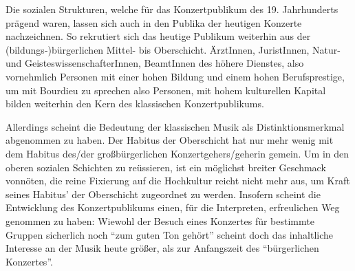 \documentclass[a4paper, german, oneside]{scrbook}
\begin{document}
Die sozialen Strukturen, welche für das Konzertpublikum des 19. Jahrhunderts prägend waren, lassen sich auch in den Publika der heutigen Konzerte nachzeichnen. So rekrutiert sich das heutige Publikum weiterhin aus der (bildungs-)bürgerlichen Mittel- bis Oberschicht. ÄrztInnen, JuristInnen, Natur-und GeisteswissenschafterInnen, BeamtInnen des höhere Dienstes, also vornehmlich Personen mit einer hohen Bildung und einem hohen Berufsprestige, um mit Bourdieu zu sprechen also Personen, mit hohem kulturellen Kapital bilden weiterhin den Kern des klassischen Konzertpublikums.

Allerdings scheint die Bedeutung der klassischen Musik als Distinktionsmerkmal abgenommen zu haben. Der Habitus der Oberschicht hat nur mehr wenig mit dem Habitus des/der großbürgerlichen Konzertgehers/geherin gemein. Um in den oberen sozialen Schichten zu reüssieren, ist ein möglichst breiter Geschmack vonnöten, die reine Fixierung auf die Hochkultur reicht nicht mehr aus, um Kraft seines Habitus' der Oberschicht zugeordnet zu werden. Insofern scheint die Entwicklung des Konzertpublikums einen, für die Interpreten, erfreulichen Weg genommen zu haben: Wiewohl der Besuch eines Konzertes für bestimmte Gruppen sicherlich noch \enquote{zum guten Ton gehört} scheint doch das inhaltliche Interesse an der Musik heute größer, als zur Anfangszeit des \enquote{bürgerlichen Konzertes}.



\printbibliography[filter=LV]
\printbibliography[heading=IQ, filter=IQ]
\end{document}
